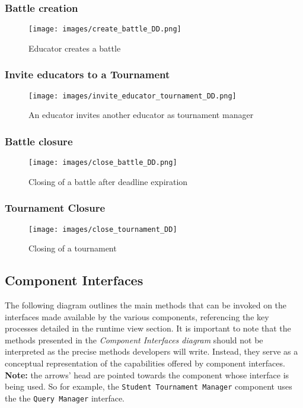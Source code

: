 \documentclass[a4paper, 11pt, titlepage]{article}
\begin{document}
\subsubsection*{Battle creation}
\begin{figure}[H]
  \centering
  \texttt{[image: images/create\_battle\_DD.png]}
  \caption{Educator creates a battle}
  \label{fig:seq_diag_create_battle}
\end{figure}

\subsubsection*{Invite educators to a Tournament}
\begin{figure}[H]
  \centering
  \texttt{[image: images/invite\_educator\_tournament\_DD.png]}
  \caption{An educator invites another educator as tournament manager}
  \label{fig:seq_diag_invite_educator}
\end{figure}

\subsubsection*{Battle closure}
\begin{figure}[H]
  \centering
  \texttt{[image: images/close\_battle\_DD.png]}
  \caption{Closing of a battle after deadline expiration}
  \label{fig:seq_diag_close_battle}
\end{figure}

\subsubsection*{Tournament Closure}
\begin{figure}[H]
  \centering
  \texttt{[image: images/close\_tournament\_DD]}
  \caption{Closing of a tournament}
  \label{fig:seq_diag_close_tournament}
\end{figure}

\subsection{Component Interfaces}

The following diagram outlines the main methods that can be invoked on the interfaces made available by the various components, referencing the key processes detailed in the runtime view section. It is important to note that the methods presented in the \textit{Component Interfaces diagram} should not be interpreted as the precise methods developers will write. Instead, they serve as a conceptual representation of the capabilities offered by component interfaces.
\newline
\textbf{Note:} the arrows' head are pointed towards the component whose interface is being used. So for example, the \texttt{Student Tournament Manager} component uses the the \texttt{Query Manager} interface.
\end{document}
